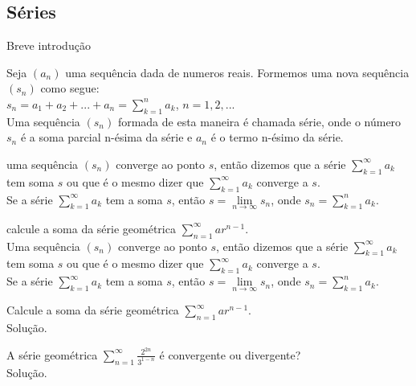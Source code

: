 \begin{center}
\section{Séries}
\end{center}
Breve introdução
\vspace*{5cm}
\begin{df}
	Seja $\left( a_{n}\right) $ uma sequência dada de numeros reais. Formemos uma nova sequência $\left( s_{n}\right) $ como segue:\\
	$s_{n}=a_{1}+a_{2}+...+a_{n}=\sum_{k=1}^{n} a_{k}$, $n=1,2,...$\\
	Uma sequência $\left( s_{n}\right)$ formada de esta maneira é chamada série, onde o número $s_{n}$ é a soma parcial n-ésima da série e $a_{n}$ é o termo n-ésimo da série.
\end{df}
\begin{df}
	uma sequência $\left( s_{n}\right)$ converge ao ponto $s$, então dizemos que a série $\sum_{k=1}^{\infty} a_{k}$ tem soma $s$ ou que é o mesmo dizer que $\sum_{k=1}^{\infty} a_{k}$ converge a $s$.\\
	Se a série $\sum_{k=1}^{\infty} a_{k}$ tem a soma $s$, então $s=\lim\limits_{n\longrightarrow \infty} s_{n}$, onde $s_{n}=\sum_{k=1}^{n} a_{k}$.
\end{df}
\begin{ex}
	calcule a soma da série geométrica $\sum_{n=1}^{\infty}ar^{n-1}$.\\
	Uma sequência $\left( s_{n}\right)$ converge ao ponto $s$, então dizemos que a série $\sum_{k=1}^{\infty} a_{k}$ tem soma $s$ ou que é o mesmo dizer que $\sum_{k=1}^{\infty} a_{k}$ converge a $s$.\\
	Se a série $\sum_{k=1}^{\infty} a_{k}$ tem a soma $s$, então $s=\lim\limits_{n\longrightarrow \infty} s_{n}$, onde $s_{n}=\sum_{k=1}^{n} a_{k}$.
\end{ex}
\begin{ex}
	Calcule a soma da série geométrica $\sum_{n=1}^{\infty}ar^{n-1}$.\\

	Solução.
\end{ex}
\vspace*{15cm}

\begin{ex}
	A série geométrica $\sum_{n=1}^{\infty}\frac{2^{2n}}{3^{1-n}}$ é convergente ou divergente?\\
	Solução.
\end{ex}
\vspace*{5cm}

